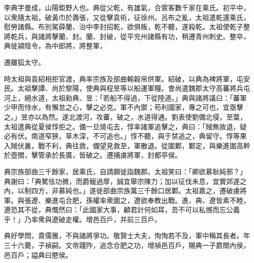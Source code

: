 \begin{pinyinscope}
 
 
 李典字曼成，山陽鉅野人也。典從父乾，有雄氣，合賔客數千家在乘氏。初平中，以衆隨太祖，破黃巾於壽張，又從擊袁術，征徐州。呂布之亂，太祖遣乾還乘氏，慰勞諸縣。布別駕薛蘭、治中李封招乾，欲俱叛，乾不聽，遂殺乾。太祖使乾子整將乾兵，與諸將擊蘭、封。蘭、封破，從平兖州諸縣有功，稍遷青州刺史。整卒，典徙潁陰令，為中郎將，將整軍，
 
 
 遷離狐太守。
 
 
 
 
 時太祖與袁紹相拒官渡，典率宗族及部曲輸穀帛供軍。紹破，以典為裨將軍，屯安民。太祖擊譚、尚於黎陽，使典與程昱等以船運軍糧。會尚遣魏郡太守高蕃將兵屯河上，絕水道，太祖勑典、昱：「若船不得過，下從陸道。」典與諸將議曰：「蕃軍少甲而恃水，有懈怠之心，擊之必克。軍不內禦；苟利國家，專之可也，宜亟擊之。」昱亦以為然。遂北渡河，攻蕃，破之，水道得通。劉表使劉備北侵，至葉，太祖遣典從夏侯惇拒之。備一旦燒屯去，惇率諸軍追擊之，典曰：「賊無故退，疑必有伏。南道窄狹，草木深，不可追也。」惇不聽，與于禁追之，典留守。惇等果入賊伏裏，戰不利，典往救，備望見救至，軍散退。從圍鄴，鄴定，與樂進圍高幹於壺關，擊管承於長廣，皆破之。遷捕虜將軍，封都亭侯。
 
 
 
 
 典宗族部曲三千餘家，居乘氏，自請願徙詣魏郡。太祖笑曰：「卿欲慕耿純邪？」典謝曰：「典駑怯功微，而爵寵過厚，誠宜舉宗陳力；加以征伐未息，宜實郊遂之內，以制四方，非慕純也。」遂徙部曲宗族萬三千餘口居鄴。太祖嘉之，遷破虜將軍。與張遼、樂進屯合肥，孫權率衆圍之，遼欲奉教出戰。進、典、遼皆素不睦，遼恐其不從，典慨然曰：「此國家大事，顧君計何如耳，吾不可以私憾而忘公義乎！」乃率衆與遼破走權。增邑百戶，并前三百戶。
 
 
 
 
 典好學問，貴儒雅，不與諸將爭功。敬賢士大夫，恂恂若不及，軍中稱其長者。年三十六薨，子禎嗣。文帝踐阼，追念合肥之功，增禎邑百戶，賜典一子爵關內侯，邑百戶；謚典曰愍侯。
 
 
\end{pinyinscope}